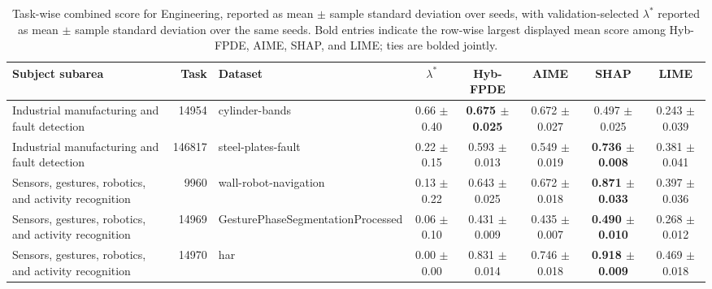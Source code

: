 \begin{table}[!tbp]
    \caption{Task-wise combined score for Engineering, reported as mean $\pm$ sample standard deviation over seeds, with validation-selected $\lambda^*$ reported as mean $\pm$ sample standard deviation over the same seeds. Bold entries indicate the row-wise largest displayed mean score among Hyb-FPDE, AIME, SHAP, and LIME; ties are bolded jointly.}
    \label{tab:taskwise_combined_scores_sd_engineering}
    \centering
    \scriptsize
    \setlength{\tabcolsep}{3pt}
    \renewcommand{\arraystretch}{1.03}
    \begin{tabular}{lrlccccc}
        \toprule
        Subject subarea & Task & Dataset & $\lambda^*$ & Hyb-FPDE & AIME & SHAP & LIME  \\
        \midrule
        Industrial manufacturing and fault detection & 14954 & cylinder-bands & 0.66 $\pm$ 0.40 & \textbf{0.675 $\pm$ 0.025} & 0.672 $\pm$ 0.027 & 0.497 $\pm$ 0.025 & 0.243 $\pm$ 0.039 \\
        Industrial manufacturing and fault detection & 146817 & steel-plates-fault & 0.22 $\pm$ 0.15 & 0.593 $\pm$ 0.013 & 0.549 $\pm$ 0.019 & \textbf{0.736 $\pm$ 0.008} & 0.381 $\pm$ 0.041 \\
        Sensors, gestures, robotics, and activity recognition & 9960 & wall-robot-navigation & 0.13 $\pm$ 0.22 & 0.643 $\pm$ 0.025 & 0.672 $\pm$ 0.018 & \textbf{0.871 $\pm$ 0.033} & 0.397 $\pm$ 0.036 \\
        Sensors, gestures, robotics, and activity recognition & 14969 & GesturePhaseSegmentationProcessed & 0.06 $\pm$ 0.10 & 0.431 $\pm$ 0.009 & 0.435 $\pm$ 0.007 & \textbf{0.490 $\pm$ 0.010} & 0.268 $\pm$ 0.012 \\
        Sensors, gestures, robotics, and activity recognition & 14970 & har & 0.00 $\pm$ 0.00 & 0.831 $\pm$ 0.014 & 0.746 $\pm$ 0.018 & \textbf{0.918 $\pm$ 0.009} & 0.469 $\pm$ 0.018 \\
        \bottomrule
    \end{tabular}%
\end{table}

